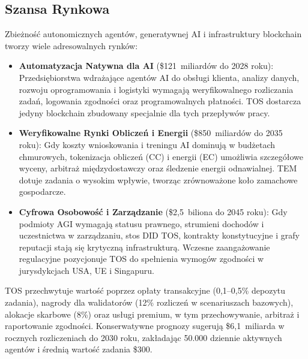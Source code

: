 \documentclass[11pt]{article}
\begin{document}
\subsection{Szansa Rynkowa}
Zbieżność autonomicznych agentów, generatywnej AI i infrastruktury blockchain tworzy wiele adresowalnych rynków:
\begin{itemize}[noitemsep]
  \item \textbf{Automatyzacja Natywna dla AI} (\$121~miliardów do 2028 roku): Przedsiębiorstwa wdrażające agentów AI do obsługi klienta, analizy danych, rozwoju oprogramowania i logistyki wymagają weryfikowalnego rozliczania zadań, logowania zgodności oraz programowalnych płatności. TOS dostarcza jedyny blockchain zbudowany specjalnie dla tych przepływów pracy.
  \item \textbf{Weryfikowalne Rynki Obliczeń i Energii} (\$850~miliardów do 2035 roku): Gdy koszty wnioskowania i treningu AI dominują w budżetach chmurowych, tokenizacja obliczeń (CC) i energii (EC) umożliwia szczegółowe wyceny, arbitraż międzydostawczy oraz śledzenie energii odnawialnej. TEM dotuje zadania o wysokim wpływie, tworząc zrównoważone koło zamachowe gospodarcze.
  \item \textbf{Cyfrowa Osobowość i Zarządzanie} (\$2,5~biliona do 2045 roku): Gdy podmioty AGI wymagają statusu prawnego, strumieni dochodów i uczestnictwa w zarządzaniu, stos DID TOS, kontrakty konstytucyjne i grafy reputacji stają się krytyczną infrastrukturą. Wczesne zaangażowanie regulacyjne pozycjonuje TOS do spełnienia wymogów zgodności w jurysdykcjach USA, UE i Singapuru.
\end{itemize}

TOS przechwytuje wartość poprzez opłaty transakcyjne (0,1--0,5\% depozytu zadania), nagrody dla walidatorów (12\% rozliczeń w scenariuszach bazowych), alokacje skarbowe (8\%) oraz usługi premium, w tym przechowywanie, arbitraż i raportowanie zgodności. Konserwatywne prognozy sugerują \$6,1~miliarda w rocznych rozliczeniach do 2030 roku, zakładając 50.000 dziennie aktywnych agentów i średnią wartość zadania \$300.
\end{document}
